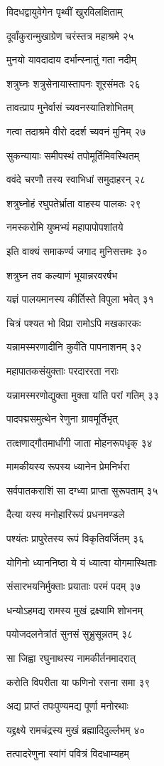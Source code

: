विदधद्वायुवेगेन पृथ्वीं खुरविलक्षिताम्

दूर्वांकुरान्मुखाग्रेण चरंस्तत्र महाश्रमे २५

मुनयो यावदादाय दर्भान्स्नातुं गता नदीम्

शत्रुघ्नः शत्रुसेनायास्तापनः शूरसंमतः २६

तावत्प्राप मुनेर्वासं च्यवनस्यातिशोभितम्

गत्वा तदाश्रमे वीरो ददर्श च्यवनं मुनिम् २७

सुकन्यायाः समीपस्थं तपोमूर्तिमिवस्थितम्

ववंदे चरणौ तस्य स्वाभिधां समुदाहरन् २८

शत्रुघ्नोहं रघुपतेर्भ्राता वाहस्य पालकः २९

नमस्करोमि युष्मभ्यं महापापोपशांतये

इति वाक्यं समाकर्ण्य जगाद मुनिसत्तमः ३०

शत्रुघ्न तव कल्याणं भूयान्नरवरर्षभ

यज्ञं पालयमानस्य कीर्तिस्ते विपुला भवेत् ३१

चित्रं पश्यत भो विप्रा रामोऽपि मखकारकः

यन्नामस्मरणादीनि कुर्वंति पापनाशनम् ३२

महापातकसंयुक्ताः परदाररता नराः

यन्नामस्मरणोद्युक्ता मुक्ता यांति परां गतिम् ३३

पादपद्मसमुत्थेन रेणुना ग्रावमूर्तिभृत्

तत्क्षणाद्गौतमार्धांगी जाता मोहनरूपधृक् ३४

मामकीयस्य रूपस्य ध्यानेन प्रेमनिर्भरा

सर्वपातकराशिं सा दग्ध्वा प्राप्ता सुरूपताम् ३५

दैत्या यस्य मनोहारिरूपं प्रधनमण्डले

पश्यंतः प्रापुरेतस्य रूपं विकृतिवर्जितम् ३६

योगिनो ध्याननिष्ठा ये यं ध्यात्वा योगमास्थिताः

संसारभयनिर्मुक्ताः प्रयाताः परमं पदम् ३७

धन्योऽहमद्य रामस्य मुखं द्रक्ष्यामि शोभनम्

पयोजदलनेत्रांतं सुनसं सुभ्रुसून्नतम् ३८

सा जिह्वा रघुनाथस्य नामकीर्तनमादरात्

करोति विपरीता या फणिनो रसना समा ३९

अद्य प्राप्तं तपःपुण्यमद्य पूर्णा मनोरथाः

यद्द्रक्ष्ये रामचंद्रस्य मुखं ब्रह्मादिदुर्ल्लभम् ४०

तत्पादरेणुना स्वांगं पवित्रं विदधाम्यहम्

